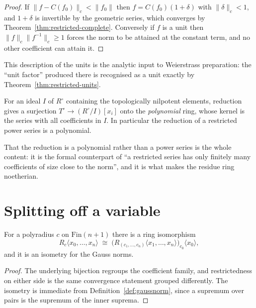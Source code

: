 \begin{proof}
  \leanok
  If $\lVert f - C(f_0)\rVert_c < \lVert f_0 \rVert$ then $f = C(f_0)(1 + \delta)$ with $\lVert
  \delta \rVert_c < 1$, and $1 + \delta$ is invertible by the geometric series, which converges
  by Theorem~\ref{thm:restricted-complete}.  Conversely if $f$ is a unit then
  $\lVert f \rVert_c \lVert f^{-1}\rVert_c \geq 1$ forces the norm to be attained at the
  constant term, and no other coefficient can attain it.
\end{proof}

This description of the units is the analytic input to Weierstrass preparation: the ``unit
factor'' produced there is recognised as a unit exactly by
Theorem~\ref{thm:restricted-units}.

\begin{proposition}
  \label{prop:reduction}
  \leanok
  For an ideal $I$ of $R^\circ$ containing the topologically nilpotent elements, reduction gives
  a surjection $T^\circ \to (R^\circ/I)[x_i]$ onto the \emph{polynomial} ring, whose kernel is
  the series with all coefficients in $I$.  In particular the reduction of a restricted power
  series is a polynomial.
\end{proposition}

That the reduction is a polynomial rather than a power series is the whole content: it is the
formal counterpart of ``a restricted series has only finitely many coefficients of size close to
the norm'', and it is what makes the residue ring noetherian.

\section{Splitting off a variable}

\begin{theorem}
  \label{thm:finsuccequiv}
  \leanok
  For a polyradius $c$ on $\mathrm{Fin}(n+1)$ there is a ring isomorphism
  \[
    R_c\langle x_0, \dots, x_n \rangle \;\cong\;
    \bigl(R_{(c_1,\dots,c_n)}\langle x_1, \dots, x_n\rangle\bigr)_{c_0}\!\langle x_0 \rangle,
  \]
  and it is an isometry for the Gauss norms.
\end{theorem}

\begin{proof}
  \leanok
  The underlying bijection regroups the coefficient family, and restrictedness on either side is
  the same convergence statement grouped differently.  The isometry is immediate from
  Definition~\ref{def:gaussnorm}, since a supremum over pairs is the supremum of the inner
  suprema.
\end{proof}

